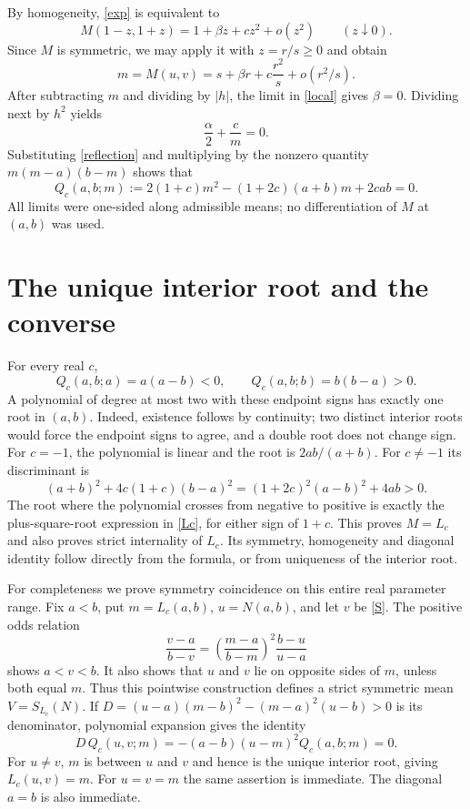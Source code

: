 \documentclass[11pt]{article}
\begin{document}
By homogeneity, \eqref{exp} is equivalent to
\[
 M(1-z,1+z)=1+\beta z+c z^2+o(z^2)\qquad(z\downarrow0).
\]
Since $M$ is symmetric, we may apply it with $z=r/s\ge0$ and obtain
\begin{equation}\label{local}
 m=M(u,v)=s+\beta r+c\frac{r^2}{s}+o(r^2/s).
\end{equation}
After subtracting $m$ and dividing by $|h|$, the limit in
\eqref{local} gives $\beta=0$. Dividing next by $h^2$ yields
\[
 \frac\alpha2+\frac{c}{m}=0.
\]
Substituting \eqref{reflection} and multiplying by the nonzero
quantity $m(m-a)(b-m)$ shows that
\begin{equation}\label{quad}
 Q_c(a,b;m):=2(1+c)m^2-(1+2c)(a+b)m+2cab=0.
\end{equation}
All limits were one-sided along admissible means; no differentiation
of $M$ at $(a,b)$ was used.

\section*{The unique interior root and the converse}
For every real $c$,
\[
 Q_c(a,b;a)=a(a-b)<0,\qquad Q_c(a,b;b)=b(b-a)>0.
\]
A polynomial of degree at most two with these endpoint signs has
exactly one root in $(a,b)$. Indeed, existence follows by continuity;
two distinct interior roots would force the endpoint signs to agree,
and a double root does not change sign. For $c=-1$, the polynomial
is linear and the root is $2ab/(a+b)$.
For $c\ne-1$ its discriminant is
\[
 (a+b)^2+4c(1+c)(b-a)^2
 =(1+2c)^2(a-b)^2+4ab>0.
\]
The root where the polynomial crosses from negative to positive is
exactly the plus-square-root expression in \eqref{Lc}, for either
sign of $1+c$. This proves $M=L_c$ and also proves strict internality
of $L_c$. Its symmetry, homogeneity and diagonal identity follow
directly from the formula, or from uniqueness of the interior root.

For completeness we prove symmetry coincidence on this entire real
parameter range. Fix $a<b$, put $m=L_c(a,b)$, $u=N(a,b)$, and let
$v$ be \eqref{S}. The positive odds relation
\[
 \frac{v-a}{b-v}=
 \left(\frac{m-a}{b-m}\right)^2\frac{b-u}{u-a}
\]
shows $a<v<b$. It also shows that $u$ and $v$ lie on opposite sides
of $m$, unless both equal $m$. Thus this pointwise construction
defines a strict symmetric mean $V=S_{L_c}(N)$.
If $D=(u-a)(m-b)^2-(m-a)^2(u-b)>0$ is its denominator, polynomial
expansion gives the identity
\begin{equation}\label{certificate}
 D\,Q_c(u,v;m)=-(a-b)(u-m)^2 Q_c(a,b;m)=0.
\end{equation}
For $u\ne v$, $m$ is between $u$ and $v$ and hence is the unique
interior root, giving $L_c(u,v)=m$. For $u=v=m$ the same assertion
is immediate. The diagonal $a=b$ is also immediate.
\end{document}
